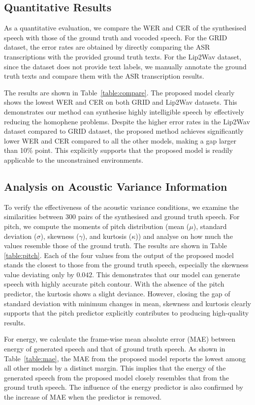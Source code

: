 \documentclass[letterpaper]{article} %
\begin{document}
\subsection{Quantitative Results}
As a quantitative evaluation, we compare the WER and CER of the synthesised speech with those of the ground truth and vocoded speech.
For the GRID dataset, the error rates are obtained by directly comparing the ASR transcriptions with the provided ground truth texts.
For the Lip2Wav dataset, since the dataset does not provide text labels, we manually annotate the ground truth texts and compare them with the ASR transcription results.

The results are shown in Table~\ref{table:compare}.
The proposed model clearly shows the lowest WER and CER on both GRID and Lip2Wav datasets.
This demonstrates our method can synthesise highly intelligible speech by effectively reducing the homophene problems.
Despite the higher error rates in the Lip2Wav dataset compared to GRID dataset, the proposed method achieves significantly lower WER and CER compared to all the other models, making a gap larger than 10\% point.
This explicitly supports that the proposed model is readily applicable to the unconstrained environments.


\subsection{Analysis on Acoustic Variance Information}

To verify the effectiveness of the acoustic variance conditions, we examine the similarities between $300$ pairs of the synthesised and ground truth speech.
For pitch, we compute the moments of pitch distribution (mean ($\mu$), standard deviation ($\sigma$), skewness ($\gamma$), and kurtosis ($\kappa$)) and analyse on how much the values resemble those of the ground truth.
The results are shown in Table \ref{table:pitch}.
Each of the four values from the output of the proposed model stands the closest to those from the ground truth speech, especially the skewness value deviating only by $0.042$. This demonstrates that our model can generate speech with highly accurate pitch contour.
With the absence of the pitch predictor, the kurtosis shows a slight deviance.
However, closing the gap of standard deviation with minimum changes in mean, skewness and kurtosis clearly supports that the pitch predictor explicitly contributes to producing high-quality results.

For energy, we calculate the frame-wise mean absolute error (MAE) between energy of generated speech and that of ground truth speech.
As shown in Table~\ref{table:mae}, the MAE from the proposed model reports the lowest among all other models by a distinct margin.
This implies that the energy of the generated speech from the proposed model closely resembles that from the ground truth speech.
The influence of the energy predictor is also confirmed by the increase of MAE when the predictor is removed.
\end{document}
